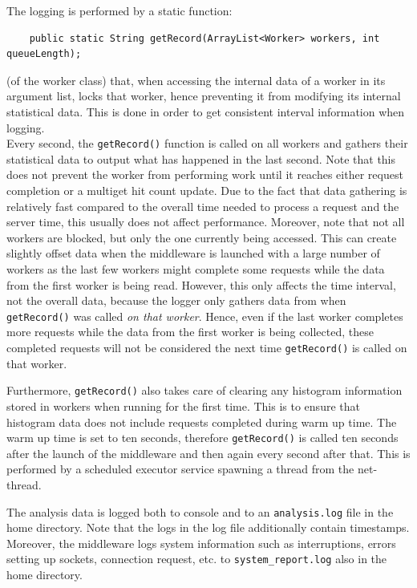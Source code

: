 \documentclass[11pt,a4paper]{article}
\begin{document}
The logging is performed by a static function:
\begin{verbatim}
    public static String getRecord(ArrayList<Worker> workers, int queueLength);
\end{verbatim}
(of the worker class) that, when accessing the internal data of a worker in its argument list, locks that worker, hence preventing it from modifying its internal statistical data. This is done in order to get consistent interval information when logging. \\
Every second, the \texttt{getRecord()} function is called on all workers and gathers their statistical data to output what has happened in the last second. Note that this does not prevent the worker from performing work until it reaches either request completion or a multiget hit count update. Due to the fact that data gathering is relatively fast compared to the overall time needed to process a request and the server time, this usually does not affect performance. Moreover, note that not all workers are blocked, but only the one currently being accessed. This can create slightly offset data when the middleware is launched with a large number of workers as the last few workers might complete some requests while the data from the first worker is being read. However, this only affects the time interval, not the overall data, because the logger only gathers data from when \texttt{getRecord()} was called \textit{on that worker}. Hence, even if the last worker completes more requests while the data from the first worker is being collected, these completed requests will not be considered the next time \texttt{getRecord()} is called on that worker.

Furthermore, \texttt{getRecord()} also takes care of clearing any histogram information stored in workers when running for the first time. This is to ensure that histogram data does not include requests completed during warm up time. The warm up time is set to ten seconds, therefore \texttt{getRecord()} is called ten seconds after the launch of the middleware and then again every second after that. This is performed by a scheduled executor service spawning a thread from the net-thread.

The analysis data is logged both to console and to an \texttt{analysis.log} file in the home directory. Note that the logs in the log file additionally contain timestamps. Moreover, the middleware logs system information such as interruptions, errors setting up sockets, connection request, etc. to \texttt{system_report.log} also in the home directory.
\end{document}
